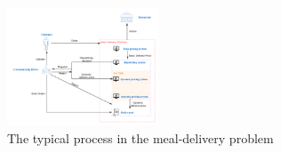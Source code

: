 \documentclass[sigconf,authordraft]{acmart}
\begin{document}
 \begin{figure}[h]
  \centering
  \includegraphics[width=0.4\textwidth]{flowchart.png}
  \caption{The typical process in the meal-delivery problem}
  \label{fig:flowchart}
\end{figure}

 


 
\end{document}
